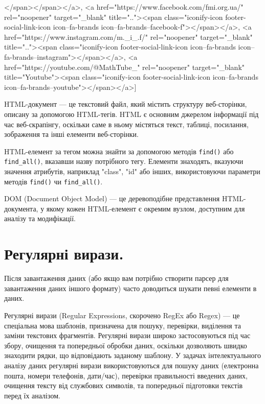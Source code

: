 \begin{console}
[<a href="/cdn-cgi/l/email-protection#77141b105a1a16031f37141f190259121302590216"><span><span class="__cf_email__" data-cfemail="a0c3ccc78dcdc1d4c8e0c3c8ced58ec5c4d58ed5c1">[email protected]</span></span></a>,
 <a href="https://www.facebook.com/fmi.org.ua/" rel="noopener" target="_blank" title=".."><span class="iconify-icon footer-social-link-icon icon--fa-brands icon--fa-brands--facebook-f"></span></a>,
 <a href="https://www.instagram.com/m._i_.f/" rel="noopener" target="_blank" title=".."><span class="iconify-icon footer-social-link-icon icon--fa-brands icon--fa-brands--instagram"></span></a>,
 <a href="https://youtube.com/@MathTube_" rel="noopener" target="_blank" title="Youtube"><span class="iconify-icon footer-social-link-icon icon--fa-brands icon--fa-brands--youtube"></span></a>]
\end{console}

HTML-документ — це текстовий файл, який містить структуру веб-сторінки, описану за допомогою 
HTML-тегів. HTML є основним джерелом інформації під час веб-скрапінгу, оскільки саме в ньому 
містяться текст, таблиці, посилання, зображення та інші елементи веб-сторінки.

HTML-елемент за тегом можна знайти за допомогою методів 
\verb|find()| або \verb|find_all()|, вказавши 
назву потрібного тегу. Елементи знаходять, вказуючи значення атрибутів, наприклад 
"class", "id" або інших, використовуючи параметри методів \verb|find()| чи 
\verb|find_all()|.

DOM (Document Object Model) — це деревоподібне представлення HTML-документа, у якому 
кожен HTML-елемент є окремим вузлом, доступним для аналізу та модифікації.





\section{Регулярні вирази.}

Після завантаження даних (або якщо вам потрібно створити парсер для завантаження даних 
іншого формату) часто доводиться шукати певні елементи в даних.

Регулярні вирази (Regular Expressions, скорочено RegEx або Regex) — це спеціальна мова 
шаблонів, призначена для пошуку, перевірки, виділення та заміни текстових фрагментів. 
Регулярні вирази широко застосовуються під час збору, очищення та попередньої обробки 
даних, оскільки дозволяють швидко знаходити рядки, що відповідають заданому шаблону. 
У задачах інтелектуального аналізу даних регулярні вирази використовуються для пошуку 
даних (електронна пошта, номери телефонів, дати/час), перевірки правильності введених 
даних, очищення тексту від службових символів, та попередньої підготовки текстів перед 
їх аналізом.

